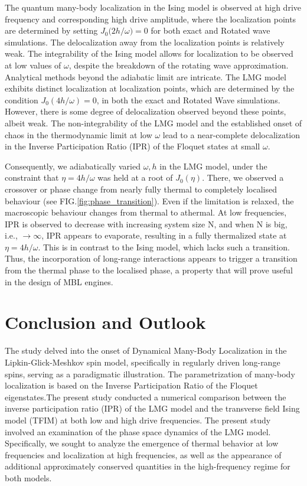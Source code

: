 \documentclass[%
reprint,
superscriptaddress,
amsmath,amssymb,
aps,
prb,
]{revtex4-2}
\begin{document}
	The quantum many-body localization in the Ising model is observed at high drive frequency and corresponding high drive amplitude, where the localization points are determined by setting $J_0(2h/{\omega}\big)=0$ for both exact and Rotated wave simulations. The delocalization away from the localization points is relatively weak. The integrability of the Ising model allows for localization to be observed at low values of $\omega$, despite the breakdown of the rotating wave approximation. Analytical methods beyond the adiabatic limit are intricate. The LMG model exhibits distinct localization at localization points, which are determined by the condition $J_0(4h/\omega)=0$, in both the exact and Rotated Wave simulations. However, there is some degree of delocalization observed beyond these points, albeit weak. The non-integrability of the LMG model and the established onset of chaos in the thermodynamic limit at low $\omega$ lead to a near-complete delocalization in the Inverse Participation Ratio (IPR) of the Floquet states at small $\omega$. 
	
	Consequently, we adiabatically varied $\omega, h$ in the LMG model, under the constraint that $\eta=4h/\omega$ was held at a root of $J_0(\eta)$. There, we observed a crossover or phase change from nearly fully thermal to completely localised behaviour (see FIG.\ref{fig:phase_transition}).
	Even if the limitation is relaxed, the macroscopic behaviour changes from thermal to athermal.
	At low frequencies, IPR is observed to decrease with increasing system size N, and when N is big, i.e., $\rightarrow{} \infty$, IPR appears to evaporate, resulting in a fully thermalized state at $\eta=4h/\omega$.
	This is in contrast to the Ising model, which lacks such a transition.
	Thus, the incorporation of long-range interactions appears to trigger a transition from the thermal phase to the localised phase, a property that will prove useful in the design of MBL engines. 
	
	\section{\label{sec:level7}Conclusion and Outlook}
	
	The study delved into the onset of Dynamical Many-Body Localization in the Lipkin-Glick-Meshkov spin model, specifically in regularly driven long-range spins, serving as a paradigmatic illustration. The parametrization of many-body localization is based on the Inverse Participation Ratio of the Floquet eigenstates.The present study conducted a numerical comparison between the inverse participation ratio (IPR) of the LMG model and the transverse field Ising model (TFIM) at both low and high drive frequencies. The present study involved an examination of the phase space dynamics of the LMG model. Specifically, we sought to analyze the emergence of thermal behavior at low frequencies and localization at high frequencies, as well as the appearance of additional approximately conserved quantities in the high-frequency regime for both models.
	
\end{document}
